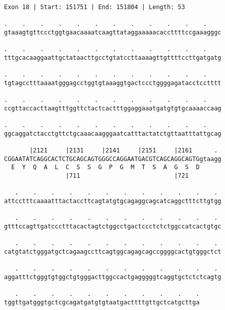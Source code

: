 \documentclass{article}
\begin{document}
\newpage
\begin{Verbatim}
Exon 18 | Start: 151751 | End: 151804 | Length: 53
 
.    .    .    .    .    .    .    .    .    .    .    .    
gtaaagtgttccctggtgaacaaaatcaagttataggaaaaacaccttttccgaaagggc
  
.    .    .    .    .    .    .    .    .    .    .    .    
tttgcacaaggaattgctataacttgcctgtatccttaaaagttgttttccttgatgatg
  
.    .    .    .    .    .    .    .    .    .    .    .    
tgtagcctttaaaatgggagcctggtgtaaaggtgactccctggggagatacctcctttt
  
.    .    .    .    .    .    .    .    .    .    .    .    
ccgttaccacttaagtttggttctactcactttggaggaaatgatgtgtgcaaaaccaag
  
.    .    .    .    .    .    .    .    .    .    .    .    
ggcaggatctacctgttctgcaaacaagggaatcatttactatctgttaatttattgcag
  
       |2121     |2131     |2141     |2151     |2161      . 
CGGAATATCAGGCACTCTGCAGCAGTGGGCCAGGAATGACGTCAGCAGGCAGTGgtaagg
  E  Y  Q  A  L  C  S  S  G  P  G  M  T  S  A  G  S  D      
                 |711                          |721         
  
   .    .    .    .    .    .    .    .    .    .    .    . 
attcctttcaaaatttactaccttcagtatgtgcagaggcagcatcaggctttcttgtgg
  
   .    .    .    .    .    .    .    .    .    .    .    . 
gtttccagttgatccctttacactagtctggcctgactccctctctggccatcactgtgc
  
   .    .    .    .    .    .    .    .    .    .    .    . 
catgtatctgggatgctcagaagccttcagtggcagagcagccggggcactgtgggctct
  
   .    .    .    .    .    .    .    .    .    .    .    . 
aggatttctgggtgtggctgtgggacttggccactgagggggtcaggtgctctctcagtg
  
   .    .    .    .    .    .    .    .    .    .    .
tggttgatgggtgctcgcagatgatgtgtaatgacttttgttgctcatgcttga
\end{Verbatim}
\newpage
\end{document}
